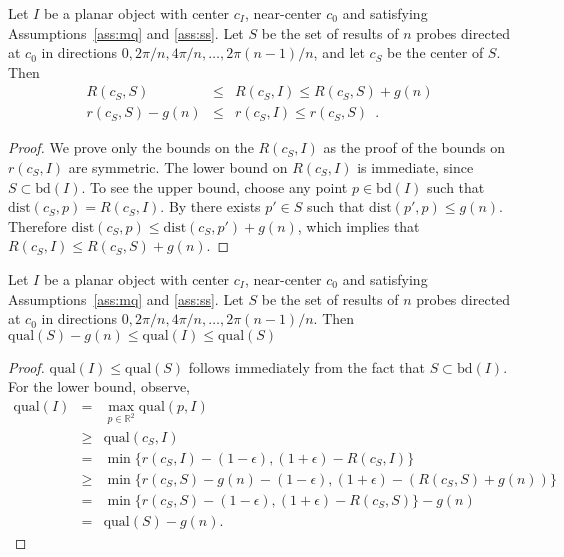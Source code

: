 \documentclass[11pt]{article}
\newcommand{\bd}{\mathrm{bd}}
\newcommand{\dist}{\mathrm{dist}}
\newcommand{\qual}{\mathrm{qual}}
\begin{document}
\begin{lem}
Let $I$ be a planar object with center $c_I$, near-center $c_0$ and
satisfying Assumptions~\ref{ass:mq} and \ref{ass:ss}.  Let $S$ be the
set of results of $n$ probes directed at $c_0$ in directions
$0,2\pi/n,4\pi/n,\ldots,2\pi(n-1)/n$, and let $c_S$ be the center of
$S$.  Then
\begin{eqnarray}
R(c_S,S) &\le& R(c_S,I) \le R(c_S,S)+g(n) \\ 
r(c_S,S)-g(n) &\le& r(c_S,I) \le r(c_S,S) \enspace . 
\end{eqnarray}
\end{lem}

\begin{proof}
We prove only the bounds on the $R(c_S,I)$ as the proof of the bounds
on $r(c_S,I)$ are symmetric.  The lower bound on $R(c_S,I)$ is
immediate, since $S\subset\bd(I)$.  To see the upper bound, choose any
point $p\in\bd(I)$ such that $\dist(c_S,p)=R(c_S,I)$.  By
 there exists $p'\in S$ such that $\dist(p',p)\le
g(n)$.  Therefore $\dist(c_S,p)\le \dist(c_S,p')+g(n)$, which
implies that $R(c_S,I)\le R(c_S, S) + g(n)$. 
\end{proof}

\begin{lem}
Let $I$ be a planar object with center $c_I$, near-center $c_0$ and
satisfying Assumptions~\ref{ass:mq} and \ref{ass:ss}.  Let $S$ be the
set of results of $n$ probes directed at $c_0$ in directions
$0,2\pi/n,4\pi/n,\ldots,2\pi(n-1)/n$.  Then $\qual(S)-g(n) \le
\qual(I)\le\qual(S)$
\end{lem}

\begin{proof}
$\qual(I)\le\qual(S)$ follows immediately from the fact that $S\subset
\bd(I)$.  For the lower bound, observe,
\begin{eqnarray}
\qual(I) & = & \max_{p\in \mathbb{R}^2}\qual(p, I) \\
  & \ge & \qual(c_S,I) \\
  & = & \min\{ r(c_S,I)-(1-\epsilon), (1+\epsilon)-R(c_S,I) \} \\
  & \ge & \min\{ r(c_S,S)-g(n)-(1-\epsilon), (1+\epsilon)-(R(c_S,S)+g(n))\}\\
  & = & \min\{ r(c_S,S)-(1-\epsilon), (1+\epsilon)-R(c_S,S)\} - g(n)  \\
  & = & \qual(S) - g(n).
\end{eqnarray} 
\end{proof}
\end{document}
